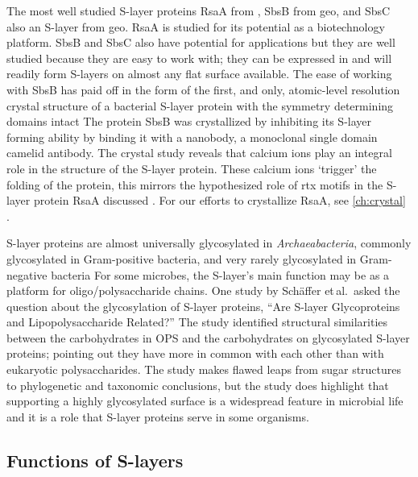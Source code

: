 The most well studied \ac{S-layer} proteins RsaA from \caulobacter{}, SbsB from \ac{geo}, and SbsC also an \ac{S-layer} from \ac{geo}. RsaA is studied for its potential as a biotechnology platform. SbsB and SbsC also have potential for applications but they are well studied because they are easy to work with; they can be expressed in \ecoli{} and will readily form \acp{S-layer} on almost any flat surface available. The ease of working with SbsB has paid off in the form of the first, and only, atomic-level resolution crystal structure of a bacterial \ac{S-layer} protein with the symmetry determining domains intact The protein SbsB was crystallized by inhibiting its \ac{S-layer} forming ability by binding it with a nanobody, a monoclonal single domain camelid antibody. The crystal study reveals that calcium ions play an integral role in the structure of the \ac{S-layer} protein. These calcium ions `trigger' the folding of the protein, this mirrors the hypothesized role of \ac{rtx} motifs in the \caulobacter{} \ac{S-layer} protein RsaA discussed . For our efforts to crystallize RsaA, see \cref{ch:crystal} .
 
\ac{S-layer} proteins are almost universally glycosylated in \textit{Archaeabacteria}, commonly
glycosylated in Gram-positive bacteria, and very rarely glycosylated in Gram-negative
bacteria
For some microbes, the \ac{S-layer}'s main function may be as a platform for oligo/polysaccharide chains. One study by Sch\"{a}ffer et\,al.~asked the question about the glycosylation of \ac{S-layer} proteins, ``Are \ac{S-layer} Glycoproteins and Lipopolysaccharide Related?'' The study identified structural similarities between the carbohydrates in \ac{OPS} and the carbohydrates on glycosylated \ac{S-layer} proteins; pointing out they have more in common with each other than with eukaryotic polysaccharides. The study makes flawed leaps from sugar structures to phylogenetic and taxonomic conclusions, but the study does highlight that supporting a highly glycosylated surface is a widespread feature in microbial life and it is a role that \ac{S-layer} proteins serve in some organisms. 

  \subsection{Functions of S-layers}
  \label{sec:intro-slayersfunction}

